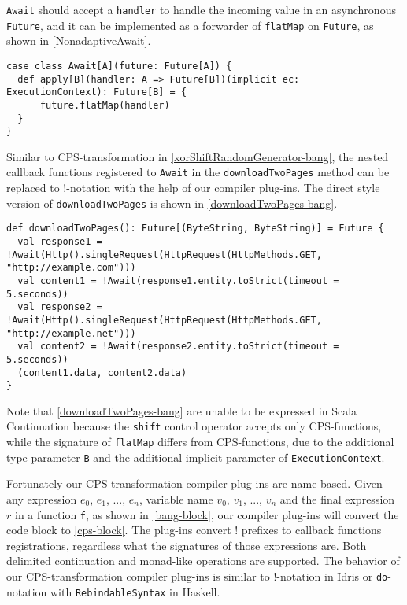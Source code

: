 \lstinline{Await} should accept a \lstinline{handler} to handle the incoming value in an asynchronous \lstinline{Future}, and it can be implemented as a forwarder of \lstinline{flatMap} on \lstinline{Future}, as shown in \cref{NonadaptiveAwait}.

\begin{lstlisting}[caption={Implementing \lstinline{Await} LDK as a forwarder to \lstinline{flatMap}},label={NonadaptiveAwait}]
case class Await[A](future: Future[A]) {
  def apply[B](handler: A => Future[B])(implicit ec: ExecutionContext): Future[B] = {
      future.flatMap(handler)
  }
}
\end{lstlisting}

Similar to CPS-transformation in \cref{xorShiftRandomGenerator-bang}, the nested callback functions registered to \lstinline{Await} in the \lstinline{downloadTwoPages} method can be replaced to !-notation with the help of our compiler plug-ins. The direct style version of \lstinline{downloadTwoPages} is shown in \cref{downloadTwoPages-bang}.

\begin{lstlisting}[caption={Asynchronously downloading two web pages, in the style of !-notation},label={downloadTwoPages-bang}]
def downloadTwoPages(): Future[(ByteString, ByteString)] = Future {
  val response1 = !Await(Http().singleRequest(HttpRequest(HttpMethods.GET, "http://example.com"))) 
  val content1 = !Await(response1.entity.toStrict(timeout = 5.seconds))
  val response2 = !Await(Http().singleRequest(HttpRequest(HttpMethods.GET, "http://example.net")))
  val content2 = !Await(response2.entity.toStrict(timeout = 5.seconds))
  (content1.data, content2.data)
}
\end{lstlisting}

Note that \cref{downloadTwoPages-bang} are unable to be expressed in Scala Continuation because the \lstinline{shift} control operator accepts only CPS-functions, while the signature of \lstinline{flatMap} differs from CPS-functions, due to the additional type parameter \lstinline{B} and the additional implicit parameter of \lstinline{ExecutionContext}.

Fortunately our CPS-transformation compiler plug-ins are name-based. Given any expression $e_0$, $e_1$, ..., $e_n$, variable name $v_0$, $v_1$, ..., $v_n$ and the final expression $r$ in a function \lstinline{f}, as shown in \cref{bang-block}, our compiler plug-ins will convert the code block to \cref{cps-block}. The plug-ins convert ! prefixes to callback functions registrations, regardless what the signatures of those expressions are. Both delimited continuation and monad-like operations are supported. The behavior of our CPS-transformation compiler plug-ins is similar to !-notation in Idris or \lstinline{do}-notation with \lstinline{RebindableSyntax} in Haskell.


